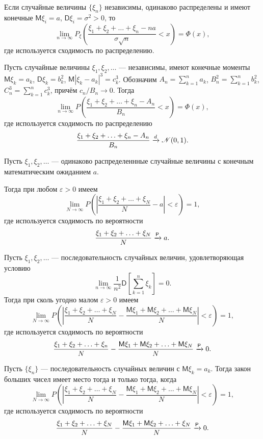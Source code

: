\begin{theorem}
	Если случайные величины $ \{\xi_n\} $ независимы, одинаково распределены и
	имеют конечные $ \mathsf M\xi_i = a $, $ \mathsf D\xi_i = \sigma^2 > 0 $, то 
	\[
		\lim_{n\to\infty} P_\xi \left( \frac{\xi_1 + \xi_2 + \ldots + \xi_n -
		na}{\sigma \sqrt n} < x \right)  = \Phi(x),
	\]
	где используется сходимость по распределению.
\end{theorem}
\begin{theorem}[Ляпунов]
Пусть случайные величины $ \xi_1, \xi_2, \ldots $ --- независимы, имеют конечные
моменты $ \mathsf M \xi_k = a_k $, $ \mathsf D\xi_k = b^2_k $, $ \mathsf
M|\xi_k-a_k|^3 = c^3_k $. Обозначим $ A_n = \sum^n_{k=1} a_k $, $ B^2_n =
\sum^n_{k=1} b^2_k $, $ C^3_n = \sum^n_{k=1}c^3_k $, причём $ c_n/B_n \to 0 $.
Тогда 
\[
	\lim_{n\to\infty} P \left( \frac{\xi_1+\xi_2+\ldots+\xi_n-A_n}{B_n} < x
		\right) = \Phi(x),
\]
где используется сходимость по распределению 
\[
		\frac{\xi_1+\xi_2+\ldots+\xi_n-A_n}{B_n} \xrightarrow[]{d} \mathscr N(0,1).
\]
\end{theorem}
\begin{theorem}[Хинчин] 
	Пусть $ \xi_1,\xi_2,\ldots $ --- одинаково распределеннные случайные величины
	с конечным математическим ожиданием $ a $.

	Тогда при любом $ \varepsilon > 0 $ имеем  
	\[
		\lim_{N\to\infty} P \left( \left| \frac{\xi_1+\xi_2+\ldots+\xi_N}{N} - a
		\right| < \varepsilon \right)  = 1,
	\]
	где используется сходимость по вероятности  
	\[
			\frac{\xi_1+\xi_2+\ldots+\xi_N}{N} \xrightarrow[]{\mathsf P} a.
	\]
\end{theorem}
\begin{theorem}[Марков]
	Пусть $ \xi_1,\xi_2,\ldots $ --- последовательность случайных величин,
	удовлетворяющая условию  
	\[
		\lim_{n\to\infty} \frac{1}{n^2} \mathsf D [\sum_{k=1}^n \xi_k] = 0.
	\]
	Тогда при сколь угодно малом $ \varepsilon > 0 $ имеем 
	\[
		\lim_{N\to\infty} P \left( \left| \frac{\xi_1 + \xi_2 + \ldots + \xi_N}{N} -
		\frac{\mathsf M \xi_1 + \mathsf M\xi_2 + \ldots + \mathsf M \xi_N}{N}\right|
	< \varepsilon \right) = 1,
	\]
где используется сходимость по вероятности  
\[
		\frac{\xi_1 + \xi_2 + \ldots + \xi_n}{N} - \frac{\mathsf M\xi_1 + \mathsf
		M\xi_2 + \ldots + \mathsf M\xi_N}{N} \xrightarrow[]{\mathsf P} 0.
\]	
\end{theorem}

\begin{theorem}
	Пусть $\{\xi_n\}$ --- последовательность случайных величин с $ \mathsf M\xi_k
	= a_k$. Тогда закон больших чисел имеет место тогда и только тогда, когда  
	\[
			\lim_{N\to\infty} P \left( \left| \frac{\xi_1 + \xi_2 + \ldots + \xi_N}{N} -
		\frac{\mathsf M \xi_1 + \mathsf M\xi_2 + \ldots + \mathsf M \xi_N}{N}\right|
	< \varepsilon \right) = 1,
	\]
где используется сходимость по вероятности  
\[
		\frac{\xi_1 + \xi_2 + \ldots + \xi_N}{N} - \frac{\mathsf M \xi_1 + \mathsf
		M\xi_2 + \ldots + \mathsf \xi_N}{N} \xrightarrow[]{\mathsf P} 0.
\]
\end{theorem}	

